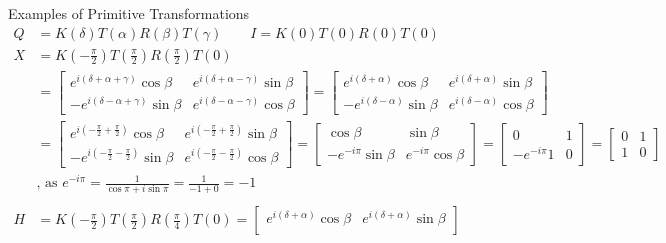 \documentclass{beamer}
\begin{document}
\begin{frame}{Examples of Primitive Transformations}
  {\tiny
    \begin{align*}
      Q &= K(\delta)T(\alpha)R(\beta)T(\gamma)  \qquad I = K(0) T(0) R(0) T(0) \\
      X &= K(-\frac{\pi}{2}) T(\frac{\pi}{2}) R(\frac{\pi}{2}) T(0) \\
        &=
        \begin{bmatrix}
          e^{i(\delta + \alpha + \gamma)} \cos\beta & e^{i(\delta + \alpha - \gamma)} \sin\beta \\
         -e^{i(\delta - \alpha + \gamma)} \sin\beta & e^{i(\delta - \alpha - \gamma)} \cos\beta
        \end{bmatrix}
        =
        \begin{bmatrix}
          e^{i(\delta + \alpha)} \cos\beta & e^{i(\delta + \alpha)} \sin\beta \\
         -e^{i(\delta - \alpha)} \sin\beta & e^{i(\delta - \alpha)} \cos\beta
        \end{bmatrix} \\
        & =
        \begin{bmatrix}
          e^{i(-\frac{\pi}{2} + \frac{\pi}{2})} \cos\beta & e^{i(-\frac{\pi}{2} + \frac{\pi}{2})} \sin\beta \\
         -e^{i(-\frac{\pi}{2} - \frac{\pi}{2})} \sin\beta & e^{i(-\frac{\pi}{2} - \frac{\pi}{2})} \cos\beta
        \end{bmatrix}
        =
        \begin{bmatrix}
          \cos\beta & \sin\beta \\
         -e^{-i\pi} \sin\beta & e^{-i\pi} \cos\beta
        \end{bmatrix}
        =
        \begin{bmatrix}
          0 & 1 \\
         -e^{-i\pi} 1 & 0 
        \end{bmatrix}
      = \begin{bmatrix} 0 & 1 \\ 1 & 0 \end{bmatrix} 
       \\
      & \text{, as } e^{-i\pi} = \frac{1}{\cos \pi + i \sin\pi} = \frac{1}{-1 + 0}  = -1
       \\
       \\
      H &= K(-\frac{\pi}{2}) T(\frac{\pi}{2}) R(\frac{\pi}{4}) T(0)
        =
        \begin{bmatrix}
          e^{i(\delta + \alpha )} \cos\beta & e^{i(\delta + \alpha)} \sin\beta \\

\end{bmatrix}
\end{align*}}
\end{frame}
\end{document}
